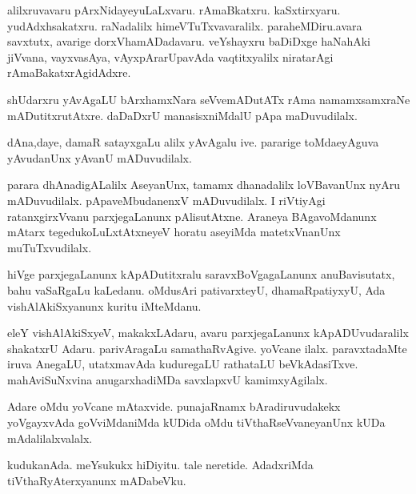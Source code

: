 \documentclass{article}
\begin{document}
\begin{mn}%
alilxruvavaru pArxNidayeyuLaLxvaru. rAmaBkatxru. kaSxtirxyaru. yudAdxhsakatxru. raNadalilx 
himeVTuTxvavaralilx. paraheMDiru.avara savxtutx, avarige dorxVhamADadavaru. veYshayxru 
baDiDxge haNahAki jiVvana, vayxvasAya, vAyxpArarUpavAda vaqtitxyalilx niratarAgi 
rAmaBakatxrAgidAdxre.
\end{mn}

\begin{mn}%
shUdarxru yAvAgaLU bArxhamxNara seVvemADutATx rAma namamxsamxraNe mADutitxrutAtxre. 
daDaDxrU manasisxniMdalU pApa maDuvudilalx.
\end{mn}

\begin{mn}%
dAna,daye, damaR satayxgaLu alilx yAvAgalu ive. pararige toMdaeyAguva yAvudanUnx yAvanU mADuvudilalx.
\end{mn}

\begin{mn}%
parara dhAnadigALalilx AseyanUnx, tamamx dhanadalilx loVBavanUnx nyAru mADuvudilalx. 
pApaveMbudanenxV mADuvudilalx. I riVtiyAgi ratanxgirxVvanu parxjegaLanunx pAlisutAtxne. 
Araneya BAgavoMdanunx mAtarx tegedukoLuLxtAtxneyeV horatu aseyiMda matetxVnanUnx 
muTuTxvudilalx.
\end{mn}

\begin{mn}%
hiVge parxjegaLanunx kApADutitxralu saravxBoVgagaLanunx anuBavisutatx, bahu vaSaRgaLu 
kaLedanu. oMdusAri pativarxteyU, dhamaRpatiyxyU, Ada vishAlAkiSxyanunx kuritu iMteMdanu.
\end{mn}

\begin{mn}%
eleY vishAlAkiSxyeV, makakxLAdaru, avaru parxjegaLanunx kApADUvudaralilx shakatxrU Adaru. 
parivAragaLu samathaRvAgive. yoVcane ilalx. paravxtadaMte iruva AnegaLU, utatxmavAda 
kuduregaLU rathataLU beVkAdasiTxve. mahAviSuNxvina anugarxhadiMDa savxlapxvU kamimxyAgilalx.
\end{mn}

\begin{mn}%
Adare oMdu yoVcane mAtaxvide. punajaRnamx bAradiruvudakekx yoVgayxvAda goVviMdaniMda 
kUDida oMdu tiVthaRseVvaneyanUnx kUDa mAdalilalxvalalx.
\end{mn}

\begin{mn}%
kudukanAda. meYsukukx hiDiyitu. tale neretide. AdadxriMda tiVthaRyAterxyanunx mADabeVku.
\end{mn}
\end{document}
